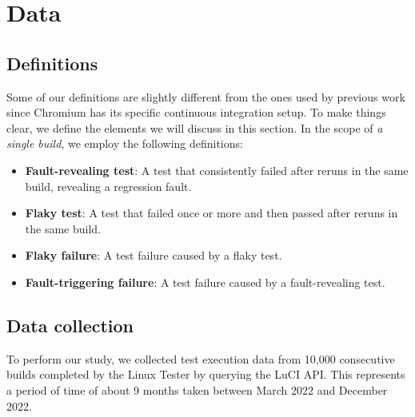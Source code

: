 \section{Data}
\label{sec:chromium-data}

\subsection{Definitions}

Some of our definitions are slightly different from the ones used by previous work since Chromium has its specific continuous integration setup. To make things clear, we define the elements we will discuss in this section.  
In the scope of \emph{a single build}, we employ the following definitions: 
\begin{itemize}
    \item \textbf{Fault-revealing test}: A test that consistently failed after reruns in the same build, revealing a regression fault.
    \item \textbf{Flaky test}: A test that failed once or more and then passed after reruns in the same build. 
    \item\textbf{Flaky failure}: A test failure caused by a flaky test.
    \item\textbf{Fault-triggering failure}: A test failure caused by a fault-revealing test.\\
\end{itemize}


\subsection{Data collection}

To perform our study, we collected test execution data from 10,000 consecutive builds completed by the Linux Tester by querying the LuCI API. This represents a period of time of about 9 months taken between March 2022 and December 2022. 

